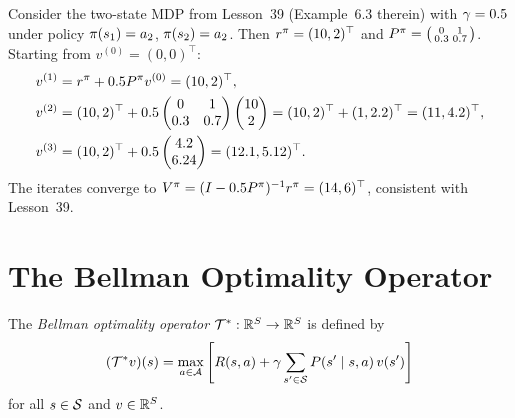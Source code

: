 \documentclass[11pt,a4paper]{article}
\begin{document}
\begin{example}
\label{ex:policy-eval-iter}
Consider the two-state MDP from Lesson~39 (Example~6.3 therein) with
$\gamma = 0.5$ under policy $\pi(s_1) = a_2$,
$\pi(s_2) = a_2$. Then
$r^\pi = (10, 2)^\top$ and
$P^\pi = \bigl(\begin{smallmatrix} 0 & 1 \\ 0.3 & 0.7
\end{smallmatrix}\bigr)$.
Starting from $v^{(0)} = (0, 0)^\top$:
\begin{align*}
    v^{(1)} &= r^\pi + 0.5 P^\pi v^{(0)}
    = (10, 2)^\top, \\
    v^{(2)} &= (10, 2)^\top + 0.5
    \begin{pmatrix} 0 & 1 \\ 0.3 & 0.7 \end{pmatrix}
    \begin{pmatrix} 10 \\ 2 \end{pmatrix}
    = (10, 2)^\top + (1, 2.2)^\top = (11, 4.2)^\top, \\
    v^{(3)} &= (10, 2)^\top + 0.5
    \begin{pmatrix} 4.2 \\ 6.24 \end{pmatrix}
    = (12.1, 5.12)^\top.
\end{align*}
The iterates converge to $V^{\pi} = (I - 0.5 P^\pi)^{-1} r^\pi
= (14, 6)^\top$, consistent with Lesson~39.
\end{example}


\section{The Bellman Optimality Operator}
\label{sec:bellman-optimality-op}

\begin{definition}
\label{def:bellman-opt-op}
The \emph{Bellman optimality operator} $\mathcal{T}^* : \mathbb{R}^S \to \mathbb{R}^S$
is defined by
\[
    (\mathcal{T}^* v)(s) = \max_{a \in \mathcal{A}}
    \left[ R(s,a) + \gamma \sum_{s' \in \mathcal{S}}
    P(s' \mid s,a)\, v(s') \right]
\]
for all $s \in \mathcal{S}$ and $v \in \mathbb{R}^S$.
\end{definition}
\end{document}
